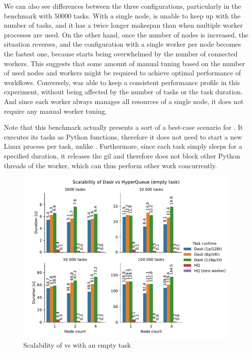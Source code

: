 We can also see differences between the three \dask{} configurations, particularly
in the benchmark with $50000$ tasks. With a single node, \dask{} is
unable to keep up with the number of tasks, and it has a twice longer makespan than when multiple
worker processes are used. On the other hand, once the number of nodes is increased, the situation
reverses, and the configuration with a single worker per node becomes the fastest one, because
\dask{} starts being overwhelmed by the number of connected workers. This suggests
that some amount of manual tuning based on the number of used nodes and workers might be required
to achieve optimal performance of \dask{} workflows. Conversely,
\hyperqueue{} was able to keep a consistent performance profile in this experiment,
without being affected by the number of tasks or the task duration. And since each
\hq{} worker always manages all resources of a single node, it does not require
any manual worker tuning.

Note that this benchmark actually presents a sort of a best-case scenario for
\dask{}. It executes its tasks as Python functions, therefore it does not need to
start a new Linux process per task, unlike \hyperqueue{}. Furthermore, since each task
simply sleeps for a specified duration, it releases the \gls{gil} and therefore does
not block other Python threads of the worker, which can thus perform other work concurrently.

\begin{figure}[h]
	\centering
	\includegraphics[width=\textwidth]{imgs/hq/charts/dask-vs-hq-empty}
	\caption{Scalability of \hyperqueue{} vs \dask{} with an empty task}
	\label{fig:hq-dask-empty}
\end{figure}

